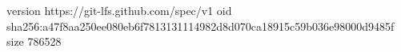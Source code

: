 version https://git-lfs.github.com/spec/v1
oid sha256:a47f8aa250ee080eb6f7813131114982d8d070ca18915c59b036e98000d9485f
size 786528

